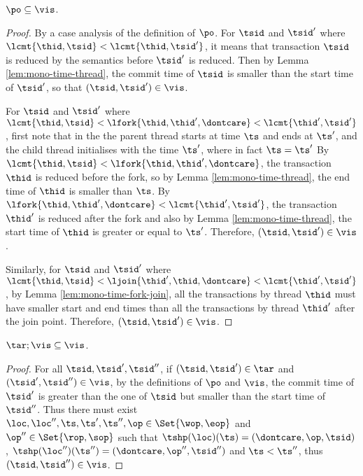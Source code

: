 \begin{lem}[Session]
    \label{lem:session}
    \( \po \subseteq \vis \).
\end{lem}   
\begin{proof}
    By a case analysis of the definition of \( \po \).
    For \( \tsid \) and \( \tsid' \) where \( \lcmt{\thid,\tsid} < \lcmt{\thid,\tsid'} \), it means that transaction \( \tsid \) is reduced by the semantics before \( \tsid' \) is reduced.
    Then by Lemma \ref{lem:mono-time-thread}, the commit time of \( \tsid \) is smaller than the start time of \( \tsid' \), so that \( (\tsid, \tsid') \in \vis \).

    For \( \tsid \) and \( \tsid' \) where \( \lcmt{\thid,\tsid} < \lfork{\thid,\thid', \dontcare} < \lcmt{\thid',\tsid'} \), first note that in the  the parent thread starts at time \( \ts \) and ends at \( \ts' \), and the child thread initialises with the time \( \ts' \), where  in fact \( \ts = \ts' \)
    By \( \lcmt{\thid,\tsid} < \lfork{\thid,\thid', \dontcare}  \), the transaction \( \thid \) is reduced before the fork, so by Lemma \ref{lem:mono-time-thread}, the end time of \( \thid \) is smaller than \( \ts \).
    By \( \lfork{\thid,\thid', \dontcare} < \lcmt{\thid',\tsid'} \), the transaction \( \thid' \) is reduced after the fork and also by Lemma \ref{lem:mono-time-thread}, the start time of \( \thid \) is greater or equal to \( \ts' \).
    Therefore, \( (\tsid, \tsid') \in \vis \).

    Similarly, for \( \tsid \) and \( \tsid' \) where \( \lcmt{\thid,\tsid} < \ljoin{\thid',\thid, \dontcare} < \lcmt{\thid',\tsid'} \), by Lemma \ref{lem:mono-time-fork-join}, all the transactions by thread \( \thid \) must have smaller start and end times than all the transactions by thread \( \thid' \) after the join point.
    Therefore, \( (\tsid, \tsid') \in \vis \).
\end{proof}


\begin{lem}
    \label{lem:semi-prefix}
    \( \tar; \vis \subseteq \vis \).
\end{lem}
\begin{proof}
    For all \( \tsid, \tsid', \tsid'' \), if \( (\tsid, \tsid') \in \tar \) and \( (\tsid', \tsid'') \in \vis \), by the definitions of \( \po \) and \( \vis \), the commit time of \( \tsid' \) is greater than the one of \( \tsid \) but smaller than the start time of \( \tsid'' \).
    Thus there must exist \( \loc, \loc'', \ts, \ts' , \ts'', \op \in \Set{\wop, \eop}  \) and \( \op'' \in \Set{\rop, \sop } \) such that  \( \tshp(\loc)(\ts) = (\dontcare, \op, \tsid) \), \( \tshp(\loc'')(\ts'') = (\dontcare, \op'', \tsid'') \) and \( \ts < \ts'' \), thus \( ( \tsid, \tsid'' ) \in \vis \).
\end{proof}

